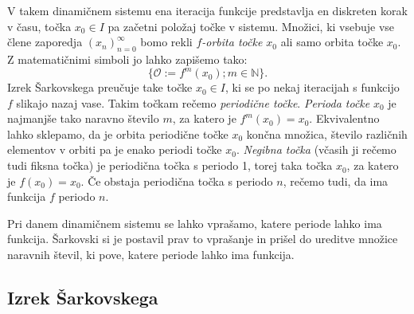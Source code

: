 \documentclass[mat2]{fmfdelo}
\newcommand{\N}{\mathbb N}
\begin{document}
V takem dinamičnem sistemu ena iteracija funkcije predstavlja en diskreten korak v času, točka $x_0 \in I$ pa začetni položaj točke v sistemu. Množici, ki vsebuje vse člene zaporedja $\left( x_n \right)_{n=0}^{\infty}$ bomo rekli \emph{$f$-orbita točke $x_0$} ali samo orbita točke $x_0$. Z matematičnimi simboli jo lahko zapišemo tako:
$$\{ \mathcal{O} := f^m(x_0) ; m \in \N \}.$$
Izrek Šarkovskega preučuje take točke $x_0 \in I$, ki se po nekaj iteracijah s funkcijo $f$ slikajo nazaj vase. Takim točkam rečemo \emph{periodične točke}. \emph{Perioda točke} $x_0$ je najmanjše tako naravno število $m$, za katero je $f^m(x_0) = x_0$. Ekvivalentno lahko sklepamo, da je orbita periodične točke $x_0$ končna množica, število različnih elementov v orbiti pa je enako periodi točke $x_0$. \emph{Negibna točka} (včasih ji rečemo tudi fiksna točka) je periodična točka s periodo 1, torej taka točka $x_0$, za katero je $f(x_0) = x_0$. Če obstaja periodična točka s periodo $n$, rečemo tudi, da ima funkcija $f$ periodo $n$.

Pri danem dinamičnem sistemu se lahko vprašamo, katere periode lahko ima funkcija. Šarkovski si je postavil prav to vprašanje in prišel do ureditve množice naravnih števil, ki pove, katere periode lahko ima funkcija.

\subsection{Izrek Šarkovskega}
\end{document}
